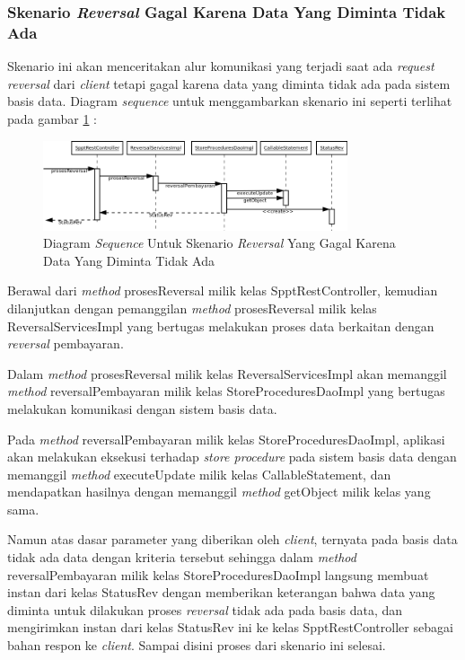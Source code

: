 \documentclass[pdftex,12pt, oneside]{article}
\begin{document}
\subsubsection{Skenario \textit{Reversal} Gagal Karena Data Yang Diminta Tidak Ada}

Skenario ini akan menceritakan alur komunikasi yang terjadi saat ada \textit{request reversal} dari \textit{client} tetapi gagal karena data yang diminta tidak ada pada sistem basis data. Diagram \textit{sequence} untuk menggambarkan skenario ini seperti terlihat pada gambar \ref{fig:uml-seq-rev-not-any} :

\begin{figure}[H]
  \centering
  \includegraphics[width=0.8\textwidth]{./resources/diagram/uml-seq-rev-null}
  \caption{Diagram \textit{Sequence} Untuk Skenario \textit{Reversal} Yang Gagal Karena Data Yang Diminta Tidak Ada}
  \label{fig:uml-seq-rev-not-any}
\end{figure}

Berawal dari \textit{method} prosesReversal milik kelas SpptRestController, kemudian dilanjutkan dengan pemanggilan \textit{method} prosesReversal milik kelas ReversalServicesImpl yang bertugas melakukan proses data berkaitan dengan \textit{reversal} pembayaran.

Dalam \textit{method} prosesReversal milik kelas ReversalServicesImpl akan memanggil \textit{method} reversalPembayaran milik kelas StoreProceduresDaoImpl yang bertugas melakukan komunikasi dengan sistem basis data.

Pada \textit{method} reversalPembayaran milik kelas StoreProceduresDaoImpl, aplikasi akan melakukan eksekusi terhadap \textit{store procedure} pada sistem basis data dengan memanggil \textit{method} executeUpdate milik kelas CallableStatement, dan mendapatkan hasilnya dengan memanggil \textit{method} getObject milik kelas yang sama.

Namun atas dasar parameter yang diberikan oleh \textit{client}, ternyata pada basis data tidak ada data dengan kriteria tersebut sehingga dalam \textit{method} reversalPembayaran milik kelas StoreProceduresDaoImpl langsung membuat instan dari kelas StatusRev dengan memberikan keterangan bahwa data yang diminta untuk dilakukan proses \textit{reversal} tidak ada pada basis data, dan mengirimkan instan dari kelas StatusRev ini ke kelas SpptRestController sebagai bahan respon ke \textit{client}. Sampai disini proses dari skenario ini selesai.
\end{document}
